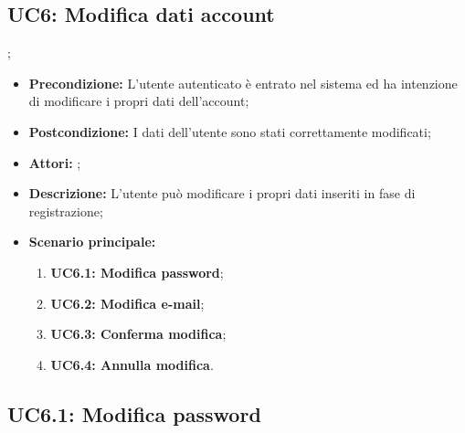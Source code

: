 \subsection{ UC6: Modifica dati account}
;
\begin{itemize}
	\item \textbf{Precondizione:} L’utente autenticato è entrato nel sistema ed ha intenzione di modificare i propri dati dell’account;
	\item \textbf{Postcondizione:} I dati dell’utente sono stati correttamente modificati;
	\item \textbf{Attori:} ;
	\item \textbf{Descrizione:} L’utente può modificare i propri dati inseriti in fase di registrazione;
	\item \textbf{Scenario principale:}
	\begin{enumerate}
		\item \textbf{ UC6.1: Modifica password};
		\item \textbf{ UC6.2: Modifica e-mail};
		\item \textbf{ UC6.3: Conferma modifica};
		\item \textbf{ UC6.4: Annulla modifica}.
	\end{enumerate}
\end{itemize}
\subsection{ UC6.1: Modifica password}

